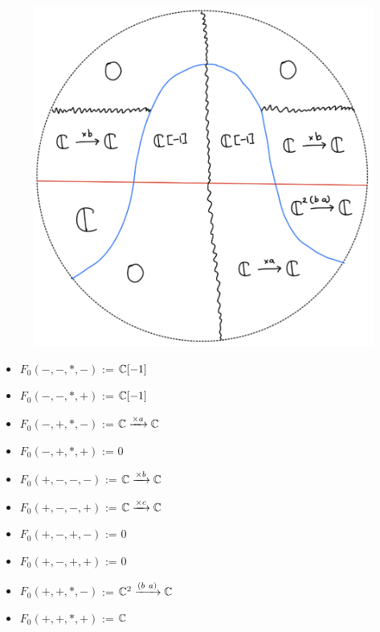 \begin{figure}[H]
    \centering
    \includegraphics[scale = 0.45]{diagrams/cobord'2/28.png} 
    \caption{}
    \label{fig:your-label}
\end{figure}
\begin{itemize}
\item $F_0(-,-,*,-)$ := $\mathbb{C}[-1]$
\item $F_0(-,-,*,+)$ := $\mathbb{C}[-1]$
\item $F_0(-,+,*,-)$ := $\mathbb{C} \xrightarrow{\times a}\mathbb{C}$
\item $F_0(-,+,*,+)$ := $0$
\item $F_0(+,-,-,-)$ := $\mathbb{C} \xrightarrow{\times b} \mathbb{C} $
\item $F_0(+,-,-,+)$ := $\mathbb{C} \xrightarrow{\times c} \mathbb{C} $
\item $F_0(+,-,+,-)$ := $0$
\item $F_0(+,-,+,+)$ := $0$
\item $F_0(+,+,*,-)$ := $\mathbb{C}^2 \xrightarrow{(b~a)}\mathbb{C}$
\item $F_0(+,+,*,+)$ := $\mathbb{C}$
\end{itemize}

